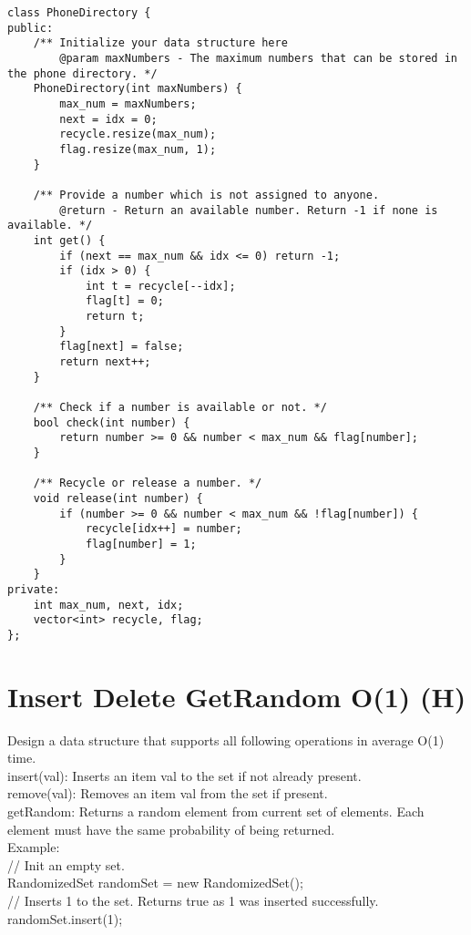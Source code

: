 \begin{lstlisting}
class PhoneDirectory {
public:
    /** Initialize your data structure here
        @param maxNumbers - The maximum numbers that can be stored in the phone directory. */
    PhoneDirectory(int maxNumbers) {
        max_num = maxNumbers;
        next = idx = 0;
        recycle.resize(max_num);
        flag.resize(max_num, 1);
    }
    
    /** Provide a number which is not assigned to anyone.
        @return - Return an available number. Return -1 if none is available. */
    int get() {
        if (next == max_num && idx <= 0) return -1;
        if (idx > 0) {
            int t = recycle[--idx];
            flag[t] = 0;
            return t;
        }
        flag[next] = false;
        return next++;
    }
    
    /** Check if a number is available or not. */
    bool check(int number) {
        return number >= 0 && number < max_num && flag[number];
    }
    
    /** Recycle or release a number. */
    void release(int number) {
        if (number >= 0 && number < max_num && !flag[number]) {
            recycle[idx++] = number;
            flag[number] = 1;
        }
    }
private:
    int max_num, next, idx;
    vector<int> recycle, flag;
};
\end{lstlisting}


\section{Insert Delete GetRandom O(1) (H)}
Design a data structure that supports all following operations in average O(1) time.\\
    insert(val): Inserts an item val to the set if not already present.\\
    remove(val): Removes an item val from the set if present.\\
    getRandom: Returns a random element from current set of elements. Each element must have the same probability of being returned.\\

Example:\\
// Init an empty set.\\
RandomizedSet randomSet = new RandomizedSet();\\

// Inserts 1 to the set. Returns true as 1 was inserted successfully.\\
randomSet.insert(1);\\

